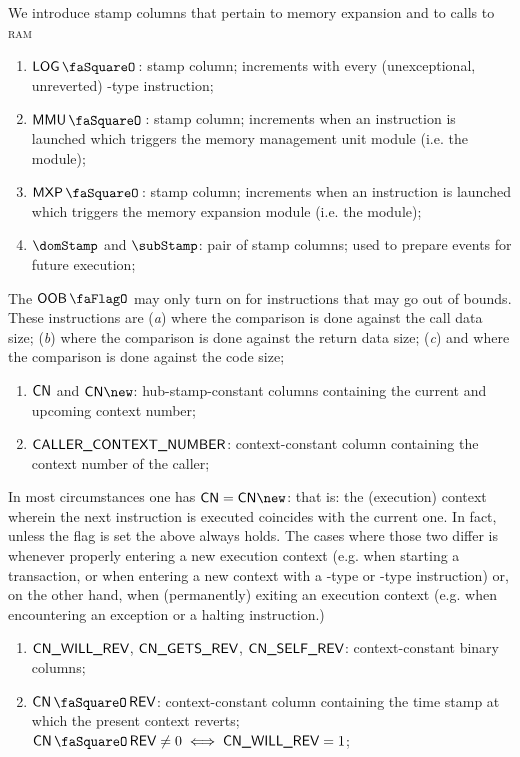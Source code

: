 We introduce stamp columns that pertain to memory expansion and to calls to \textsc{ram}
\begin{enumerate}[resume]
	\item $\logStamp$:
		stamp column; increments with every (unexceptional, unreverted) -type instruction; 
	\item $\mmuStamp$:
		stamp column; increments when an instruction is launched which triggers the memory management unit module (i.e. the \mmuMod{} module);
	\item $\mxpStamp$:
		stamp column; increments when an instruction is launched which triggers the memory expansion module (i.e. the \mxpMod{} module);
	\item $\domStamp$ and $\subStamp$:
		pair of stamp columns; used to prepare events for future execution; 
\end{enumerate}
The $\oobFlag$ may only turn on for instructions that may go out of bounds. These instructions are
(\emph{a})  where the comparison is done against the call data size;
(\emph{b})  where the comparison is done against the return data size;
(\emph{c})  and  where the comparison is done against the code size;
\begin{enumerate}[resume]
	\item $\textsf{CN}{}$ and $\cn{}\new$:
		hub-stamp-constant columns containing the current and upcoming context number;
	\item $\textsf{CALLER\_CONTEXT\_NUMBER}{}$:
		context-constant column containing the context number of the caller;
\end{enumerate}
In most circumstances one has $\cn{} = \cn{}\new$: that is: the (execution) context wherein the next instruction is executed coincides with the current one. In fact, unless the \CONTEXTMAYCHANGE{} flag is set the above always holds. The cases where those two differ is whenever properly entering a new execution context (e.g. when starting a transaction, or when entering a new context with a -type or -type instruction) or, on the other hand, when (permanently) exiting an execution context (e.g. when encountering an exception or a halting instruction.) 
\begin{enumerate}[resume]
	\item $\textsf{CN}\textsf{\_WILL\_REV}$, $\textsf{CN}\textsf{\_GETS\_REV}$, $\textsf{CN}\textsf{\_SELF\_REV}$:
		context-constant binary columns;
	\item $\cnRevStamp$:
		context-constant column containing the time stamp at which the present context reverts; $\cnRevStamp \neq 0 \iff \cnWillRev = 1$;
\end{enumerate}
